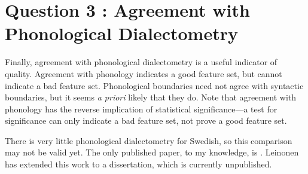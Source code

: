 
\section{Question 3 : Agreement with Phonological Dialectometry}

Finally, agreement with phonological dialectometry is a useful
indicator of quality. Agreement with phonology indicates a good
feature set, but cannot indicate a bad feature set. Phonological
boundaries need not agree with syntactic boundaries, but it seems {\it
  a priori} likely that they do. Note that agreement with phonology
has the reverse implication of statistical
significance---a test for significance can only indicate a bad
feature set, not prove a good feature set.

There is very little phonological dialectometry for Swedish, so this
comparison may not be valid yet. The only published paper, to my
knowledge, is . Leinonen has extended this work
to a dissertation, which is currently unpublished.

